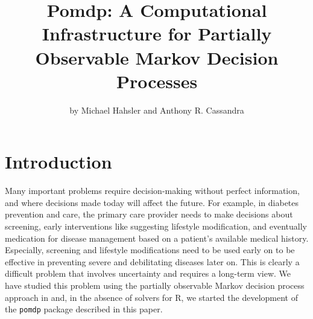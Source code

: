 \title{Pomdp: A Computational Infrastructure for Partially Observable Markov Decision Processes}


\author{by Michael Hahsler and Anthony R. Cassandra}

\maketitle


\section{Introduction}\label{introduction}

Many important problems require decision-making without perfect information,
and where decisions made today will affect the future.
For example, in diabetes prevention and care, the primary care
provider needs to make decisions about screening, early interventions
like suggesting lifestyle modification, and eventually
medication for disease management
based on a patient's available medical history. Especially,
screening and lifestyle modifications need to be used early on to
be effective in preventing severe and debilitating diseases later on.
This is clearly a difficult problem that involves uncertainty and
requires a long-term view. We have studied this problem
using the partially observable Markov decision process approach in
\citep{hahsler:Kamalzadeh:2021} and, in the absence of solvers for R,
we started the development of the \texttt{pomdp}
package described in this paper.

